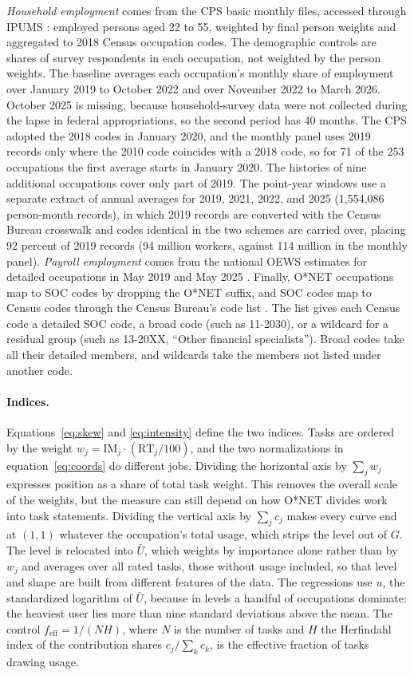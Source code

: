 \documentclass[12pt]{article}
\theoremstyle{plain}
\theoremstyle{definition}
\theoremstyle{remark}
\begin{document}
\emph{Household employment} comes from the CPS basic monthly files, accessed through IPUMS
\citep{IPUMSCPS2025}: employed persons aged 22 to 55, weighted by final
person weights and aggregated to 2018 Census occupation codes. The
demographic controls are shares of survey respondents in each
occupation, not weighted by the person weights. The
baseline averages each occupation's monthly share of employment over
January 2019 to October 2022 and over November 2022 to March 2026. October
2025 is missing, because household-survey data were not collected during
the lapse in federal appropriations, so the second period has 40 months.
The CPS adopted the 2018 codes in January 2020, and the monthly panel uses
2019 records only where the 2010 code coincides with a 2018 code, so for
71 of the 253 occupations the first average starts in January 2020. The
histories of nine additional occupations cover only part of 2019. The
point-year windows use a separate extract of annual averages for 2019,
2021, 2022, and 2025 (1,554,086 person-month records), in which 2019
records are converted with the Census Bureau crosswalk and codes
identical in the two schemes are carried over, placing 92 percent of
2019 records (94 million workers, against 114 million in the monthly
panel). \emph{Payroll employment} comes from the national OEWS
estimates for detailed occupations in May 2019 and May 2025
\citep{BLSOEWS}. Finally, O*NET occupations map to SOC codes by dropping
the O*NET suffix, and SOC codes map to Census codes through the Census
Bureau's code list \citep{CensusOcc2018}. The list gives each Census code
a detailed SOC code, a broad code (such as 11-2030), or a wildcard for a
residual group (such as 13-20XX, ``Other financial specialists''). Broad
codes take all their detailed members, and wildcards take the members not
listed under another code.

\paragraph{Indices.}
Equations~\eqref{eq:skew} and \eqref{eq:intensity} define the two
indices. Tasks are ordered by the weight
$w_j=\mathrm{IM}_j\cdot(\mathrm{RT}_j/100)$,
and the two normalizations in equation~\eqref{eq:coords} do different
jobs. Dividing the horizontal axis by $\sum_j w_j$ expresses position as a
share of total task weight. This removes the overall scale of the
weights, but the measure can still depend on how O*NET divides work
into task statements. Dividing the vertical axis by $\sum_j c_j$
makes every curve end at $(1,1)$ whatever the occupation's total usage,
which strips the level out of $G$. The level is relocated into $\bar{U}$,
which weights by importance alone rather than by $w_j$ and averages over
all rated tasks, those without usage included, so that level and shape
are built from different features of the data. The regressions use $u$,
the standardized logarithm of $\bar{U}$, because in levels a handful of
occupations dominate: the heaviest user lies more than nine standard
deviations above the mean. The control $f_{\mathrm{eff}}=1/(N H)$, where
$N$ is the number of tasks and $H$ the Herfindahl index of the
contribution shares $c_j/\sum_k c_k$, is the effective fraction of tasks
drawing usage.
\end{document}
